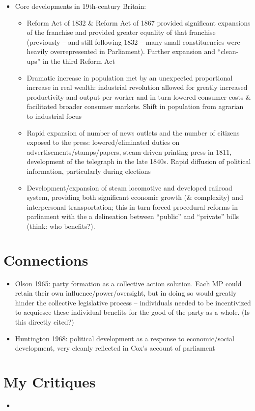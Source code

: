 \documentclass[12pt]{article}
\begin{document}
\begin{itemize}[leftmargin=*, itemsep=4pt]
    \item Core developments in 19th-century Britain:
    \begin{itemize}
        \item Reform Act of 1832 \& Reform Act of 1867 provided significant expansions of the franchise and provided greater equality of that franchise (previously -- and still following 1832 -- many small constituencies were heavily overrepresented in Parliament). Further expansion and ``clean-ups'' in the third Reform Act
        \item Dramatic increase in population met by an unexpected proportional increase in real wealth: industrial revolution allowed for greatly increased productivity and output per worker and in turn lowered consumer costs \& facilitated broader consumer markets. Shift in population from agrarian to industrial focus
        \item Rapid expansion of number of news outlets and the number of citizens exposed to the press: lowered/eliminated duties on advertisements/stamps/papers, steam-driven printing press in 1811, development of the telegraph in the late 1840s. Rapid diffusion of political information, particularly during elections
        \item Development/expansion of steam locomotive and developed railroad system, providing both significant economic growth (\& complexity) and interpersonal transportation; this in turn forced procedural reforms in parliament with the a delineation between ``public'' and ``private'' bills (think: who benefits?).
    \end{itemize}
\end{itemize}


\section{Connections}

\begin{itemize}
    \item Olson 1965: party formation as a collective action solution. Each MP could retain their own influence/power/oversight, but in doing so would greatly hinder the collective legislative process -- individuals needed to be incentivized to acquiesce these individual benefits for the good of the party as a whole. (Is this directly cited?)
    \item Huntington 1968: political development as a response to economic/social development, very cleanly reflected in Cox's account of parliament
\end{itemize}


\section{My Critiques}

\begin{itemize}
    \item
\end{itemize}
\end{document}
